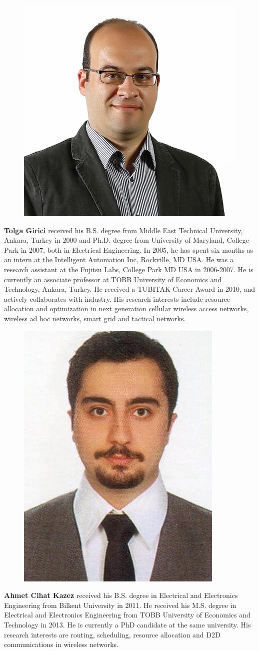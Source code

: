 \documentclass[10pt,a4paper,twocolumn]{article}
\begin{document}
\begin{figure} 
	\vspace{-.1in}
	\includegraphics[width=0.37\columnwidth]{tolgagirici.jpg} 
\end{figure}\textbf{Tolga Girici} received his B.S. degree from Middle East Technical University, Ankara, Turkey in 2000 and Ph.D. degree from University of Maryland, College Park in 2007, both in Electrical Engineering. In 2005, he has spent six months as an intern at the Intelligent Automation Inc, Rockville, MD USA. He was a research assistant at the Fujitsu Labs, College Park MD USA in 2006-2007. He is currently an associate professor at TOBB University of Economics and Technology, Ankara, Turkey. He received a TUBITAK Career Award in 2010, and actively collaborates with industry. His research interests include resource allocation and optimization in next generation cellular wireless access networks, wireless ad hoc networks, smart grid and tactical networks.


\begin{figure} 
	\vspace{-.1in}
	\includegraphics[width=0.32\columnwidth]{ACKazez.jpg} 
\end{figure}\textbf{Ahmet Cihat Kazez} received his B.S. degree in Electrical and Electronics Engineering from Bilkent University in 2011. He received his M.S. degree in Electrical and Electronics Engineering from TOBB University of Economics and Technology in 2013. He is currently a PhD candidate at the same university. His research interests are routing, scheduling, resource allocation and D2D communications in wireless networks.
\end{document}
